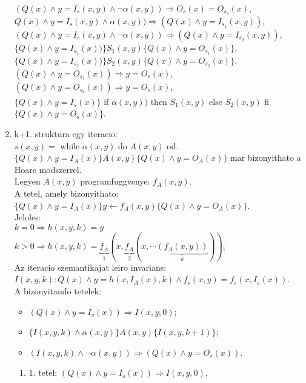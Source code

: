 \documentclass[a4paper,10pt]{article}
\begin{document}
\begin{enumerate}
$(Q(x)\wedge y=I_s(x,y)\wedge \neg\alpha(x,y)) \Rightarrow O_s(x)=O_{s_2}(x)$,\\
$Q(x)\wedge y=I_s(x,y) \wedge \alpha(x,y)) \Rightarrow (Q(x) \wedge y=I_{s_1}(x,y))$,\\
$(Q(x)\wedge y=I_s(x,y) \wedge \neg\alpha(x,y)) \Rightarrow (Q(x) \wedge y=I_{s_2}(x,y))$,\\
$\lbrace Q(x)\wedge y=I_{s_1}(x))\rbrace S_1(x,y) \lbrace Q(x)\wedge y=O_{s_1}(x)\rbrace$,\\
$\lbrace Q(x)\wedge y=I_{s_2}(x))\rbrace S_2(x,y) \lbrace Q(x)\wedge y=O_{s_2}(x)\rbrace$,\\
$(Q(x)\wedge y=O_{s_1}(x)) \Rightarrow y=O_s(x)$,\\
$\underline{(Q(x)\wedge y=O_{s_2}(x)) \Rightarrow y=O_s(x)}$,\\
$\lbrace Q(x)\wedge y=I_s(x)\rbrace$ if $\alpha (x,y))$ then $S_1(x,y)$ else $S_2(x,y)$ fi $\lbrace Q(x) \wedge y=O_s(x)\rbrace$.
\item k+1. struktura egy iteracio:\\
$s(x,y)=$ while $\alpha(x,y)$ do $A(x,y)$ od.\\
$\lbrace Q(x) \wedge y=I_A(x)\rbrace A(x,y) \lbrace Q(x)\wedge y=O_A(x)\rbrace$ mar bizonyithato a Hoare modszerrel.\\
Legyen $A(x,y)$ programfuggvenye: $f_A(x,y)$.\\
A tetel, amely bizonyithato: $\lbrace Q(x) \wedge y=I_A(x)\rbrace y\leftarrow f_A(x,y) \lbrace Q(x) \wedge y=O_A(x)\rbrace$.\\
Jeloles:\\
$k=0 \Rightarrow h(x,y,k) = y$\\
$k>0 \Rightarrow h(x,y,k) = \underbrace{f_A}_{1}(x, \underbrace{f_A}_{2}(x, \cdots\underbrace{(f_A(x,y))}_{k}))$;\\
Az iteracio szemantikajat leiro invarians: $I(x,y,k):Q(x)\wedge y=h(x,I_A(x),k) \wedge f_s(x,y) = f_s(x, I_s(x))$.\\
A bizonyitando tetelek:
\begin{itemize}
\item $(Q(x) \wedge y=I_s(x)) \Rightarrow I(x,y,0)$;
\item $\lbrace I(x,y,k) \wedge \alpha(x,y)\rbrace A(x,y) \lbrace I(x,y,k+1)\rbrace$;
\item $(I(x,y,k) \wedge \neg\alpha(x,y)) \Rightarrow (Q(x) \wedge y=O_s(x))$.
\end{itemize}
\begin{enumerate}
\item 1. tetel: $(Q(x) \wedge y=I_s(x)) \Rightarrow I(x,y,0)$,\\

\end{enumerate}
\end{enumerate}
\end{document}
